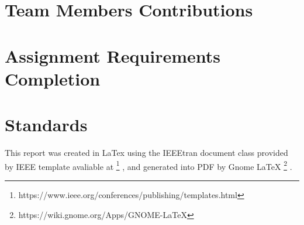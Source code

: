 \documentclass[conference]{IEEEtran}
\begin{document}
\section{Team Members Contributions}
\section{Assignment Requirements Completion}
\section{Standards}
This report was created in LaTex using the IEEEtran document class provided by IEEE template avaliable at
\footnote{https://www.ieee.org/conferences/publishing/templates.html}
, and generated into PDF by Gnome LaTeX
\footnote{https://wiki.gnome.org/Apps/GNOME-LaTeX}
.
\end{document}
